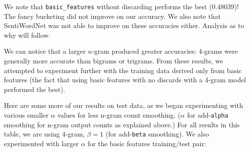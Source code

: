 \documentclass{article}
\begin{document}
We note that \texttt{basic\_features} without discarding performs the best (0.48039)! The fancy bucketing did not improve on our accuracy. We also note that SentiWordNet was not able to improve on these accuracies either. Analysis as to why will follow.\par

We can notice that a larger $n$-gram produced greater accuracies: 4-grams were generally more accurate than bigrams or trigrams. From these results, we attempted to experiment further with the training data derived only from basic features (the fact that using basic features with no discards with a 4-gram model performed the best).\par\bigskip

Here are some more of our results on test data, as we began experimenting with various smaller $\alpha$ values for less n-gram count smoothing. ($\alpha$ for add-\texttt{alpha} smoothing for n-gram output counts as explained above.) For all results in this table, we are using 4-gram, $\beta = 1$ (for add-\texttt{beta} smoothing). We also experimented with larger $\alpha$ for the basic features training/test pair:\par\bigskip
\end{document}
